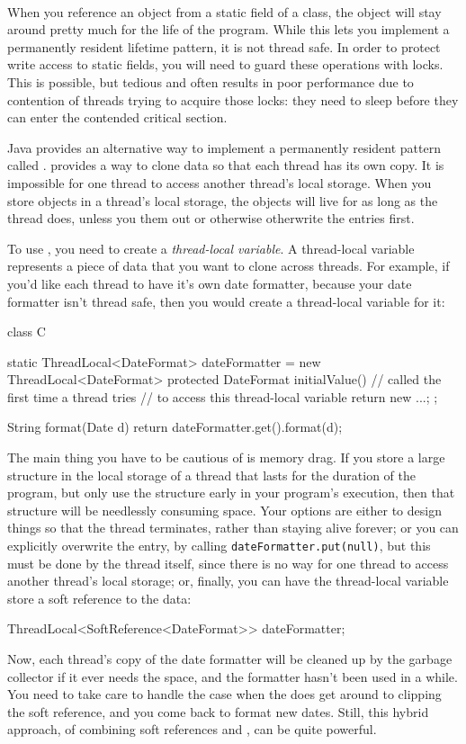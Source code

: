 \paragraph{\TLS}
\tlsindex %
When you reference an object from a static field of a class, the object will
stay around pretty much for the life of the program. While this lets you
implement a permanently resident lifetime pattern, it is not thread safe. In
order to protect write access to static fields, you will need to guard these
operations with locks. This is possible, but tedious and often results in poor
performance due to contention of threads trying to acquire those locks: they
need to sleep before they can enter the contended critical section.

Java provides an alternative way to implement a permanently resident pattern
called \emph{\tls\/}. \tls provides a way to clone data so that each thread has
its own copy. It is impossible for one thread to access another thread's local
storage. When you store objects in a thread's local storage, the objects will
live for as long as the thread does, unless you  them out or
otherwise otherwrite the entries first.

To use \tls, you need to create a \emph{thread-local variable}. A thread-local
variable represents a piece of data that you want to clone across threads. For
example, if you'd like each thread to have it's own date formatter, because your
date formatter isn't thread safe, then you would create a thread-local variable
for it:
\begin{shortlisting}
class C {
   static ThreadLocal<DateFormat> dateFormatter = new ThreadLocal<DateFormat> {
      protected DateFormat initialValue() {
         // called the first time a thread tries
         // to access this thread-local variable
         return new ...;
      }
   };
   
   String format(Date d) {
      return dateFormatter.get().format(d);
   }
}
\end{shortlisting}
The main thing you have to be cautious of is memory drag. If you store a large
structure in the local storage of a thread that lasts for the duration of the
program, but only use the structure early in your program's execution, then that
structure will be needlessly consuming space. Your options are either to design
things so that the thread terminates, rather than staying alive forever; or you
can explicitly overwrite the entry, by calling {\tt dateFormatter.put(null)},
but this must be done by the thread itself, since there is no way for one thread
to access another thread's local storage; or, finally, you can have the
thread-local variable store a soft reference to the data:
\begin{shortlisting}
ThreadLocal<SoftReference<DateFormat>> dateFormatter;
\end{shortlisting}
Now, each thread's copy of the date formatter will be cleaned up by the garbage
collector if it ever needs the space, and the formatter hasn't been used in a
while. You need to take care to handle the case when the \jre does get around to
clipping the soft reference, and you come back to format new dates. Still, this
hybrid approach, of combining soft references and \tls, can be quite powerful.

